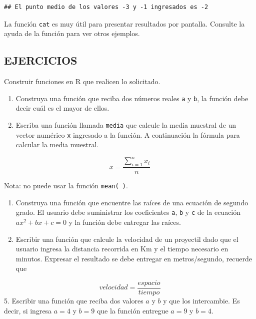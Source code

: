 \documentclass[10pt,]{krantz}
\let\BeginKnitrBlock\begin \let\EndKnitrBlock\end
\begin{document}
\begin{verbatim}
## El punto medio de los valores -3 y -1 ingresados es -2
\end{verbatim}

\BeginKnitrBlock{rmdnote}
La función \texttt{cat} es muy útil para presentar resultados por
pantalla. Consulte la ayuda de la función para ver otros ejemplos.
\EndKnitrBlock{rmdnote}

\subsection*{EJERCICIOS}\label{ejercicios-1}

Construir funciones en R que realicen lo solicitado.

\begin{enumerate}
\def\labelenumi{\arabic{enumi}.}
\item
  Construya una función que reciba dos números reales \texttt{a} y
  \texttt{b}, la función debe decir cuál es el mayor de ellos.
\item
  Escriba una función llamada \texttt{media} que calcule la media
  muestral de un vector numérico \texttt{x} ingresado a la función. A
  continuación la fórmula para calcular la media muestral.
\end{enumerate}

\[\bar{x}=\frac{\sum_{i=1}^n x_i}{n}\]

Nota: no puede usar la función \texttt{mean(\ )}.

\begin{enumerate}
\def\labelenumi{\arabic{enumi}.}
\setcounter{enumi}{2}
\item
  Construya una función que encuentre las raíces de una ecuación de
  segundo grado. El usuario debe suministrar los coeficientes
  \texttt{a}, \texttt{b} y \texttt{c} de la ecuación \(ax^2+bx+c=0\) y
  la función debe entregar las raíces.
\item
  Escribir una función que calcule la velocidad de un proyectil dado que
  el usuario ingresa la distancia recorrida en Km y el tiempo necesario
  en minutos. Expresar el resultado se debe entregar en metros/segundo,
  recuerde que
\end{enumerate}

\[velocidad = \frac{espacio}{tiempo}\] 5. Escribir una función que
reciba dos valores \(a\) y \(b\) y que los intercambie. Es decir, si
ingresa \(a=4\) y \(b=9\) que la función entregue \(a=9\) y \(b=4\).
\end{document}
